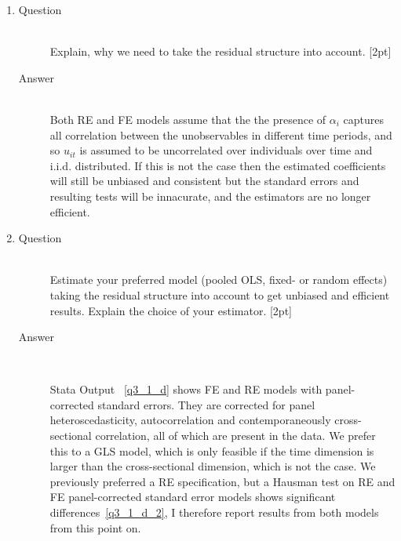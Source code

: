 \documentclass{article}
\begin{document}
\begin{enumerate}
\begin{enumerate}[label=(\alph*)]
    \newpage
    \item 
    \begin{description}
      \item[Question] \hfill \\
      Explain, why we need to take the residual structure into account. [2pt]
      \item[Answer] \hfill \\
      Both RE and FE models assume that the the presence of \(\alpha_i\) captures all correlation between the unobservables in different time periods, and so \(u_{it}\) is assumed to be uncorrelated over individuals over time and i.i.d. distributed. If this is not the case then the estimated coefficients will still be unbiased and consistent but the standard errors and resulting tests will be innacurate, and the estimators are no longer efficient.
    \end{description}
    
    \newpage
    \item 
    \begin{description}
      \item[Question] \hfill \\
      Estimate your preferred model (pooled OLS, fixed- or random effects) taking the residual structure into account to get unbiased and efficient results. Explain the choice of your estimator. [2pt]
      \item[Answer] \hfill \\
      \begin{figure}
      
      \end{figure}
      Stata Output ~\ref{q3_1_d} shows FE and RE models with panel-corrected standard errors. They are corrected for panel heteroscedasticity, autocorrelation and contemporaneously cross-sectional correlation, all of which are present in the data. We prefer this to a GLS model, which is only feasible if the time dimension is larger than the cross-sectional dimension, which is not the case. We previously preferred a RE specification, but a Hausman test on RE and FE panel-corrected standard error models shows significant differences~\ref{q3_1_d_2}, I therefore report results from both models from  this point on.
      \begin{figure}
      
      \end{figure}
    \end{description}
    

\end{enumerate}
\end{enumerate}
\end{document}
